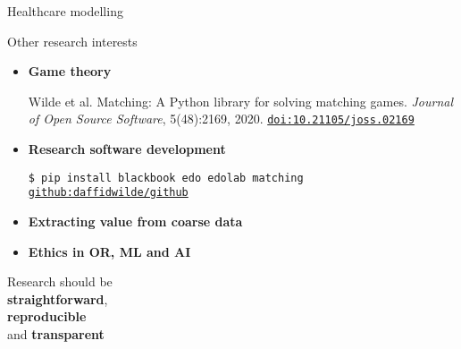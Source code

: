 \documentclass[final]{beamer}
\newcommand{\doi}[1]{%
    \href{https://doi.org/#1}{\small\nolinkurl{doi:#1}}%
}
\newcommand{\github}[1]{%
    \href{https://github.com/#1}{\small\nolinkurl{github:#1}}%
}
\begin{document}
\begin{frame}{Healthcare modelling}
    \begin{figure}
        \centering
        \resizebox{\linewidth}{!}{%
            
        }
    \end{figure}
\end{frame}
        
\begin{frame}{Other research interests}
    \begin{itemize}
        \setlength{\itemsep}{1em}
        \item \textbf{Game theory\\} {\footnotesize%
                Wilde et al. Matching: A Python library for solving matching
                games. \emph{Journal of Open Source Software}, 5(48):2169, 2020.
                \doi{10.21105/joss.02169}
            }
        \item \textbf{Research software development\\[1ex]} {\footnotesize%
                \texttt{\$ pip install blackbook edo edolab matching}\\
                \github{daffidwilde/github}
            }
        \item \textbf{Extracting value from coarse data}
        \item \textbf{Ethics in OR, ML and AI}
    \end{itemize}
\end{frame}

\begin{frame}
    \huge
    Research should be\\
    \textbf{straightforward},\\
    \textbf{reproducible}\\
    and \textbf{transparent}
\end{frame}
\end{document}
